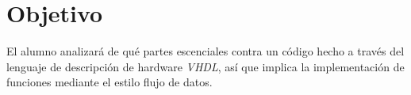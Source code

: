 \documentclass[../main.tex]{subfiles}
\begin{document}
\section{Objetivo}
El alumno analizará de qué partes escenciales contra un código hecho a través 
del lenguaje de descripción de hardware \textit{VHDL}, así que implica la 
implementación de funciones mediante el estilo flujo de datos.
\end{document}
